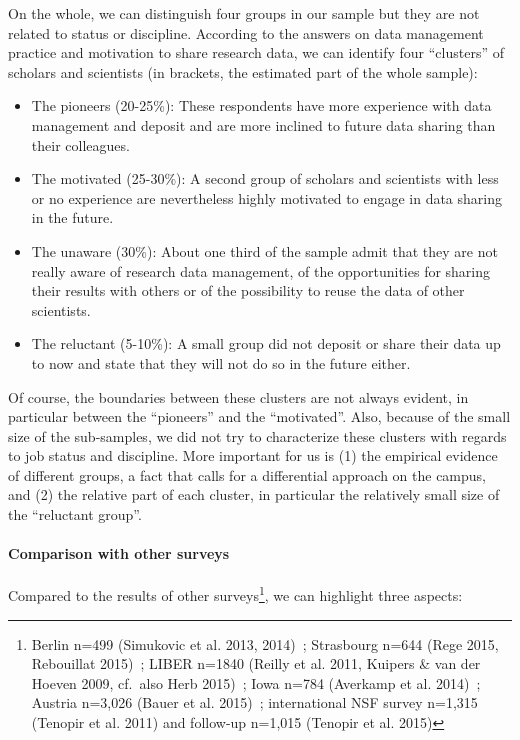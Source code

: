 \documentclass[a4paper,
fontsize=11pt,
oneside,
numbers=noperiodatend,
parskip=half-,
bibliography=totoc,
final
]{scrartcl}
\begin{document}
On the whole, we can distinguish four groups in our sample but they are
not related to status or discipline. According to the answers on data
management practice and motivation to share research data, we can
identify four \enquote{clusters} of scholars and scientists (in
brackets, the estimated part of the whole sample):

\begin{itemize}
\item
  The pioneers (20-25\%): These respondents have more experience with
  data management and deposit and are more inclined to future data
  sharing than their colleagues.
\item
  The motivated (25-30\%): A second group of scholars and scientists
  with less or no experience are nevertheless highly motivated to engage
  in data sharing in the future.
\item
  The unaware (30\%): About one third of the sample admit that they are
  not really aware of research data management, of the opportunities for
  sharing their results with others or of the possibility to reuse the
  data of other scientists.
\item
  The reluctant (5-10\%): A small group did not deposit or share their
  data up to now and state that they will not do so in the future
  either.
\end{itemize}

Of course, the boundaries between these clusters are not always evident,
in particular between the \enquote{pioneers} and the
\enquote{motivated}. Also, because of the small size of the sub-samples,
we did not try to characterize these clusters with regards to job status
and discipline. More important for us is (1) the empirical evidence of
different groups, a fact that calls for a differential approach on the
campus, and (2) the relative part of each cluster, in particular the
relatively small size of the \enquote{reluctant group}.

\paragraph{Comparison with other
surveys}\label{comparison-with-other-surveys}

Compared to the results of other surveys\footnote{Berlin n=499
  (Simukovic et al. 2013, 2014)~; Strasbourg n=644 (Rege 2015,
  Rebouillat 2015)~; LIBER n=1840 (Reilly et al. 2011, Kuipers \& van
  der Hoeven 2009, cf.~also Herb 2015)~; Iowa n=784 (Averkamp et al.
  2014)~; Austria n=3,026 (Bauer et al. 2015)~; international NSF survey
  n=1,315 (Tenopir et al. 2011) and follow-up n=1,015 (Tenopir et al.
  2015)}, we can highlight three aspects:
\end{document}
